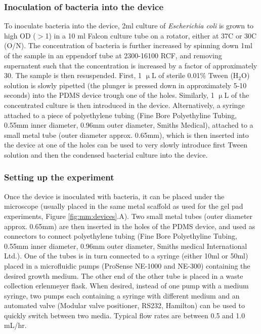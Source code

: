 \subsubsection{Inoculation of bacteria into the device}
To inoculate bacteria into the device, 2ml culture of \textit{Escherichia coli} is grown to high OD ($>$1) in a 10 ml Falcon culture tube on a rotator, either at 37C or 30C (O/N). 
The concentration of bacteria is further increased by spinning down 1ml of the sample in an eppendorf tube at 2300-16100 RCF, and removing supernatent such that the concentration is increased by a factor of approximately 30. The sample is then resuspended.
%
First, 1 $\upmu$L of sterile 0.01\% Tween ($\text{H}_2\text{O}$) solution is slowly pipetted (the plunger is pressed down in approximately 5-10 seconds) into the PDMS device trough one of the holes.
Similarly, 1 $\upmu$L of the concentrated culture is then introduced in the device.
%
Alternatively, a syringe attached to a piece of polyethylene tubing (Fine Bore Polyethyline Tubing, 0.55mm inner diameter, 0.96mm outer diameter, Smiths Medical), attached to a small metal tube (outer diameter approx. 0.65mm), which is then inserted into the device at one of the holes can be used to very slowly introduce first Tween solution and then the condensed bacterial culture into the device.

\subsubsection{Setting up the experiment}
Once the device is inoculated with bacteria, it can be placed under the microscope (usually placed in the same metal scaffold as used for the gel pad experiments, Figure \ref{fig:mm:devices}.A). 
Two small metal tubes (outer diameter approx. 0.65mm) are then inserted in the holes of the PDMS device, and used as connectors to connect polyethylene tubing (Fine Bore Polyethyline Tubing, 0.55mm inner diameter, 0.96mm outer diameter, Smiths medical International Ltd.).
One of the tubes is in turn connected to a syringe (either 10ml or 50ml) placed in a microfluidic pumps (ProSense NE-1000 and NE-300) containing the desired growth medium.
The other end of the other tube is placed in a waste collection erlenmeyer flask.
When desired, instead of one pump with a medium syringe, two pumps each containing a syringe with different medium and an automated valve (Modular valve positioner, RS232, Hamilton) can be used to quickly switch between two media.
Typical flow rates are between 0.5 and 1.0 mL/hr.

